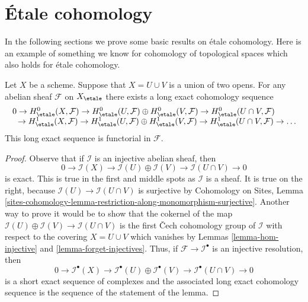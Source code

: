 \section{\'Etale cohomology}
\label{section-etale-cohomology}

\noindent
In the following sections we prove some basic results on \'etale cohomology.
Here is an example of something we know for cohomology of topological
spaces which also holds for \'etale cohomology.

\begin{lemma}
\label{lemma-mayer-vietoris}
Let $X$ be a scheme. Suppose that $X = U \cup V$ is a
union of two opens. For any abelian sheaf $\mathcal{F}$ on $X_\etale$
there exists a long exact cohomology sequence
$$
\begin{matrix}
0 \to
H^0_\etale(X, \mathcal{F}) \to
H^0_\etale(U, \mathcal{F}) \oplus H^0_\etale(V, \mathcal{F}) \to
H^0_\etale(U \cap V, \mathcal{F}) \phantom{\to \ldots} \\
\phantom{0} \to H^1_\etale(X, \mathcal{F}) \to
H^1_\etale(U, \mathcal{F}) \oplus H^1_\etale(V, \mathcal{F}) \to
H^1_\etale(U \cap V, \mathcal{F}) \to \ldots
\end{matrix}
$$
This long exact sequence is functorial in $\mathcal{F}$.
\end{lemma}

\begin{proof}
Observe that if $\mathcal{I}$ is an injective abelian sheaf, then
$$
0 \to \mathcal{I}(X) \to \mathcal{I}(U) \oplus \mathcal{I}(V) \to
\mathcal{I}(U \cap V) \to 0
$$
is exact. This is true in the first and middle spots as $\mathcal{I}$
is a sheaf. It is true on the right, because
$\mathcal{I}(U) \to \mathcal{I}(U \cap V)$ is surjective by
Cohomology on Sites, Lemma
\ref{sites-cohomology-lemma-restriction-along-monomorphism-surjective}.
Another way to prove it would be to show that the cokernel
of the map $\mathcal{I}(U) \oplus \mathcal{I}(V) \to
\mathcal{I}(U \cap V)$ is the first {\v C}ech cohomology group
of $\mathcal{I}$ with respect to the covering
$X = U \cup V$ which vanishes by
Lemmas \ref{lemma-hom-injective} and \ref{lemma-forget-injectives}.
Thus, if $\mathcal{F} \to \mathcal{I}^\bullet$ is an injective
resolution, then
$$
0 \to \mathcal{I}^\bullet(X) \to
\mathcal{I}^\bullet(U) \oplus \mathcal{I}^\bullet(V) \to
\mathcal{I}^\bullet(U \cap V) \to 0
$$
is a short exact sequence of complexes and the associated long
exact cohomology sequence is the sequence of the statement of the lemma.
\end{proof}

